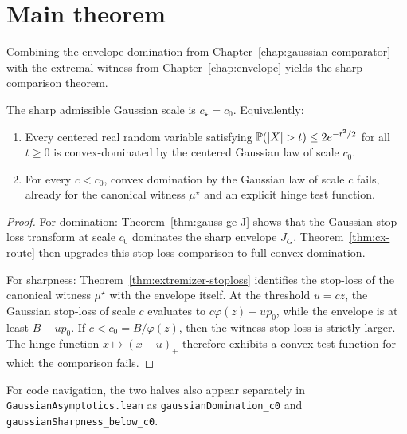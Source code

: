\chapter{Main theorem}\label{chap:main}

Combining the envelope domination from Chapter~\ref{chap:gaussian-comparator}
with the extremal witness from Chapter~\ref{chap:envelope} yields the sharp
comparison theorem.

\begin{theorem}\label{thm:main}
\leanok
{}
The sharp admissible Gaussian scale is $c_\star = c_0$. Equivalently:
\begin{enumerate}
\item Every centered real random variable satisfying
  $\Prb(|X|>t)\le 2e^{-t^2/2}$ for all $t \ge 0$ is convex-dominated by the
  centered Gaussian law of scale $c_0$.
\item For every $c < c_0$, convex domination by the Gaussian law of scale $c$
  fails, already for the canonical witness $\mu^\star$ and an explicit hinge
  test function.
\end{enumerate}
\end{theorem}

\begin{proof}\leanok
For domination: Theorem~\ref{thm:gauss-ge-J}
shows that the Gaussian stop-loss transform at scale $c_0$ dominates the sharp
envelope $J_G$. Theorem~\ref{thm:cx-route} then upgrades this stop-loss
comparison to full convex domination.

For sharpness: Theorem~\ref{thm:extremizer-stoploss} identifies the stop-loss of
the canonical witness $\mu^\star$ with the envelope itself. At the
threshold $u = cz$, the Gaussian stop-loss of scale $c$ evaluates to
$c\varphi(z) - up_0$, while the envelope is at least $B - up_0$. If
$c < c_0 = B/\varphi(z)$, then the witness stop-loss is strictly larger. The
hinge function $x \mapsto (x-u)_+$ therefore exhibits a convex test
function for which the comparison fails.
\end{proof}

For code navigation, the two halves also appear separately in
\texttt{GaussianAsymptotics.lean} as \texttt{gaussianDomination\_c0} and
\texttt{gaussianSharpness\_below\_c0}.
